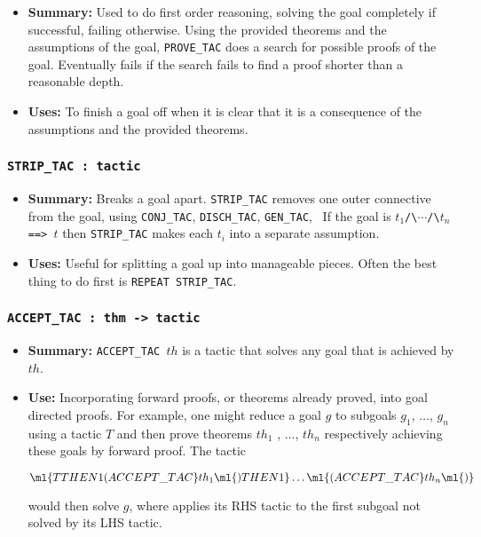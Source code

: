 \begin{itemize}
\item {\bf Summary:} Used to do first order reasoning, solving the
  goal completely if successful, failing otherwise.  Using the
  provided theorems and the assumptions of the goal,
  {\small\verb|PROVE_TAC|} does a search for possible proofs of the
  goal.  Eventually fails if the search fails to find a proof shorter
  than a reasonable depth.
\item {\bf Uses:} To finish a goal off when it is clear that it is a
  consequence of the assumptions and the provided theorems.
\end{itemize}


\subsubsection{\tt STRIP\_TAC : tactic}

\begin{itemize}

\item{\bf Summary:} Breaks a goal apart.  {\small\verb|STRIP_TAC|}
  removes one outer connective from the goal, using
  {\small\verb|CONJ_TAC|}, {\small\verb|DISCH_TAC|},
  {\small\verb|GEN_TAC|}, \etc\ If the goal is
$t_1${\small\verb|/\|}$\cdots${\small\verb|/\|}$t_n${\small\verb| ==> |}$t$
then {\small\verb|STRIP_TAC|} makes each $t_i$ into a separate assumption.

\item{\bf Uses:} Useful for splitting a goal up into manageable pieces.
Often the best thing to do first is {\small\verb|REPEAT STRIP_TAC|}.
\end{itemize}

\subsubsection{\tt ACCEPT\_TAC : thm -> tactic}\label{ACCEPTTAC}


\begin{itemize}

\item{\bf Summary:} {\small\verb|ACCEPT_TAC |}$th$
is a tactic that solves any goal that is
achieved by $th$.

\item{\bf Use:} Incorporating forward proofs, or theorems already
  proved, into goal directed proofs.  For example, one might reduce a
  goal $g$ to subgoals $g_1$, $\dots$, $g_n$ using a tactic $T$ and
  then prove theorems $th_1$ , $\dots$, $th_n$ respectively achieving
  these goals by forward proof. The tactic

\[\ml{  T THEN1(ACCEPT\_TAC }th_1\ml{) THEN1}\ldots\ml{(ACCEPT\_TAC }th_n\ml{)}
\]

would then solve $g$, where 
applies its RHS tactic to the first subgoal not solved by its LHS tactic.

\end{itemize}



